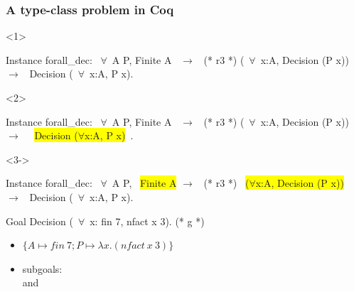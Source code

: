 \documentclass{pres}
\begin{document}
\begin{frame}[fragile]
  \frametitle{A type-class problem in Coq}

  \begin{onlyenv}<1>
    \begin{coqcode}
      Instance forall_dec: ~$\forall$~A P, Finite A ~$\to$~            (* r3 *)
        (~$\forall$~x:A, Decision (P x)) ~$\to$~ Decision (~$\forall$~x:A, P x).
    \end{coqcode}
  \end{onlyenv}

  \begin{onlyenv}<2>
    \begin{coqcode}
      Instance forall_dec: ~$\forall$~A P, Finite A ~$\to$~            (* r3 *)
        (~$\forall$~x:A, Decision (P x)) ~$\to$~ ~\colorbox{yellow}{Decision ($\forall$x:A, P x)}~.
    \end{coqcode}
  \end{onlyenv}

  \begin{onlyenv}<3->
    \begin{coqcode}
      Instance forall_dec: ~$\forall$~A P, ~\colorbox{yellow}{Finite A} $\to$~           (* r3 *)
        ~\colorbox{yellow}{($\forall$x:A, Decision (P x))}~ ~$\to$~ Decision (~$\forall$~x:A, P x).
    \end{coqcode}
  \end{onlyenv}

  \mysep{}

  \begin{coqcode}
    Goal Decision (~$\forall$~x: fin 7, nfact x 3).             (* g *)
  \end{coqcode}

  \begin{itemize}
    \item<2-> $\{A \mapsto fin\ 7; P \mapsto \lambda x.(nfact\ x\ 3)\}$
    \item<3> subgoals:\\
       and 
  \end{itemize}


\end{frame}
\end{document}

